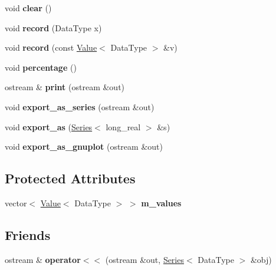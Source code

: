 \begin{DoxyCompactItemize}
void {\bfseries clear} ()
\item 
\mbox{\label{classez_1_1maths_1_1Series_a0678da807c1edd794ecd38aa8c320695}} 
void {\bfseries record} (Data\+Type x)
\item 
\mbox{\label{classez_1_1maths_1_1Series_a1a54c4a270dd475621e818a541bb00fc}} 
void {\bfseries record} (const \hyperlink{classez_1_1maths_1_1Value}{Value}$<$ Data\+Type $>$ \&v)
\item 
\mbox{\label{classez_1_1maths_1_1Series_aa43d9e98629a7393b6a1a7be75c1e46a}} 
void {\bfseries percentage} ()
\item 
\mbox{\label{classez_1_1maths_1_1Series_a2581b7712b1a93ebb7dfa23933039b0e}} 
ostream \& {\bfseries print} (ostream \&out)
\item 
\mbox{\label{classez_1_1maths_1_1Series_af3c448bdc8b7b890afa2d82cd13099dd}} 
void {\bfseries export\+\_\+as\+\_\+series} (ostream \&out)
\item 
\mbox{\label{classez_1_1maths_1_1Series_ac570d87d41bb8f9dc63281152c237af3}} 
void {\bfseries export\+\_\+as} (\hyperlink{classez_1_1maths_1_1Series}{Series}$<$ long\+\_\+real $>$ \&s)
\item 
\mbox{\label{classez_1_1maths_1_1Series_a265100b5fe761ebb2f096b38dc2558e8}} 
void {\bfseries export\+\_\+as\+\_\+gnuplot} (ostream \&out)
\end{DoxyCompactItemize}
\subsection*{Protected Attributes}
\begin{DoxyCompactItemize}
\item 
\mbox{\label{classez_1_1maths_1_1Series_abff25e7c45cf942429299e013e5949e4}} 
vector$<$ \hyperlink{classez_1_1maths_1_1Value}{Value}$<$ Data\+Type $>$ $>$ {\bfseries m\+\_\+values}
\end{DoxyCompactItemize}
\subsection*{Friends}
\begin{DoxyCompactItemize}
\item 
\mbox{\label{classez_1_1maths_1_1Series_a1b2351e1596a6da5ee7e040e48881887}} 
ostream \& {\bfseries operator$<$$<$} (ostream \&out, \hyperlink{classez_1_1maths_1_1Series}{Series}$<$ Data\+Type $>$ \&obj)
\end{DoxyCompactItemize}


